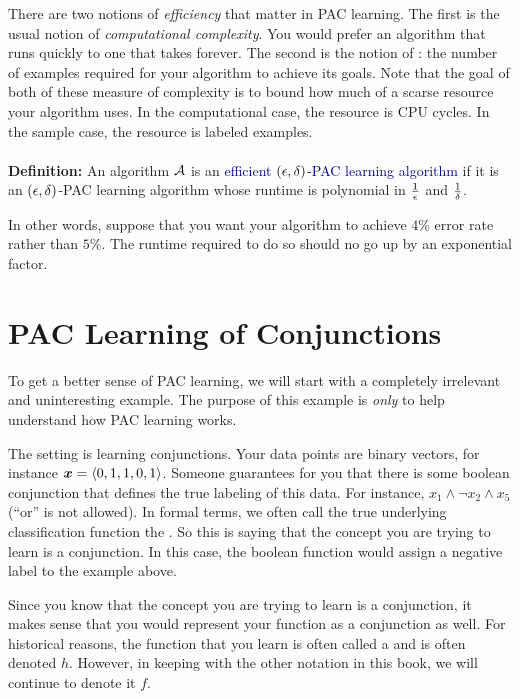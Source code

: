 There are two notions of \emph{efficiency} that matter in PAC
learning.  The first is the usual notion of \emph{computational
  complexity}.  You would prefer an algorithm that runs quickly to one
that takes forever.  The second is the notion of : the number of examples required for your algorithm to
achieve its goals.  Note that the goal of both of these measure of
complexity is to bound how much of a scarse resource your algorithm
uses.  In the computational case, the resource is CPU cycles.  In the
sample case, the resource is labeled examples.
\\
~\\
\noindent
{\bf Definition:} An algorithm $\mathcal{A}$ is an
\textcolor{darkblue}{efficient $(\epsilon,\delta)$-PAC learning algorithm} if
it is an $(\epsilon,\delta)$-PAC learning algorithm whose runtime is
polynomial in $\frac 1 {\epsilon}$ and $\frac 1 {\delta}$.

In other words, suppose that you want your algorithm to achieve $4\%$
error rate rather than $5\%$.  The runtime required to do so should no
go up by an exponential factor.

\section{PAC Learning of Conjunctions}

To get a better sense of PAC learning, we will start with a completely
irrelevant and uninteresting example.  The purpose of this example is
\emph{only} to help understand how PAC learning works.

The setting is learning conjunctions.  Your data points are binary
vectors, for instance ${\boldsymbol{x}} = \langle 0,1,1,0,1 \rangle$.  Someone
guarantees for you that there is some boolean conjunction that defines
the true labeling of this data.  For instance, $x_1 \land \lnot x_2
\land x_5$ (``or'' is not allowed).  In formal terms, we often call
the true underlying classification function the .  So
this is saying that the concept you are trying to learn is a
conjunction.  In this case, the boolean function would assign a
negative label to the example above.

Since you know that the concept you are trying to learn is a
conjunction, it makes sense that you would represent your function as
a conjunction as well.  For historical reasons, the function that you
learn is often called a  and is often denoted $h$.
However, in keeping with the other notation in this book, we will
continue to denote it $f$.

